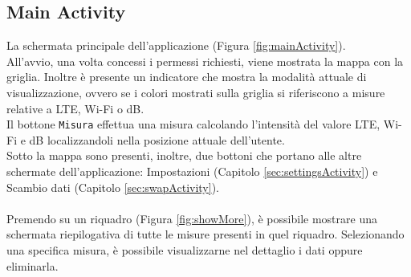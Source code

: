 \documentclass[11pt]{article}
\begin{document}
\subsection{Main Activity}
\begin{minipage}[t]{0.65\textwidth}
La schermata principale dell'applicazione (Figura \ref{fig:mainActivity}). \\
All'avvio, una volta concessi i permessi richiesti, viene mostrata la mappa con la griglia. Inoltre è presente un indicatore che mostra la modalità attuale di visualizzazione, ovvero se i colori mostrati sulla griglia si riferiscono a misure relative a LTE, Wi-Fi o dB. \\
Il bottone \texttt{Misura} effettua una misura calcolando l'intensità del valore LTE, Wi-Fi e dB localizzandoli nella posizione attuale dell'utente. \\
Sotto la mappa sono presenti, inoltre, due bottoni che portano alle altre schermate dell'applicazione: Impostazioni (Capitolo \ref{sec:settingsActivity}) e Scambio dati (Capitolo \ref{sec:swapActivity}). \\ \\
Premendo su un riquadro (Figura \ref{fig:showMore}), è possibile mostrare una schermata riepilogativa di tutte le misure presenti in quel riquadro. Selezionando una specifica misura, è possibile visualizzarne nel dettaglio i dati oppure eliminarla.
\end{minipage} \hfill
\end{document}

